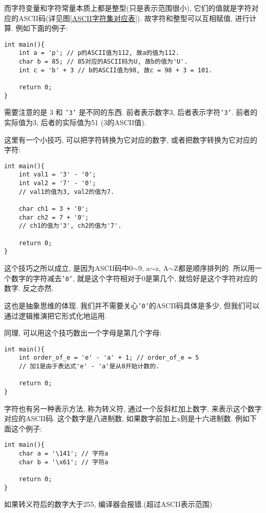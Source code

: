         而字符变量和字符常量本质上都是整型(只是表示范围很小), 它们的值就是字符对应的ASCII码(详见图\ref{ASCII字符集对应表}). 故字符和整型可以互相赋值, 进行计算. 例如下面的例子:
\begin{lstlisting}
int main(){
    int a = 'p'; // p的ASCII值为112, 故a的值为112.
    char b = 85; // 85对应的ASCII码为U, 故b的值为'U'.
    int c = 'b' + 3 // b的ASCII值为98, 故c = 98 + 3 = 101.

    return 0;
}
\end{lstlisting}

        需要注意的是 3 和 \texttt{'3'} 是不同的东西. 前者表示数字3, 后者表示字符\texttt{'3'}. 前者的实际值为3, 后者的实际值为51 (3的ASCII值).

        这里有一个小技巧, 可以把字符转换为它对应的数字, 或者把数字转换为它对应的字符:
\begin{lstlisting}
int main(){
    int val1 = '3' - '0'; 
    int val2 = '7' - '0';
    // val1的值为3, val2的值为7.

    char ch1 = 3 + '0';
    char ch2 = 7 + '0';
    // ch1的值为'3', ch2的值为'7'.

    return 0;
}
\end{lstlisting}
        
        这个技巧之所以成立, 是因为ASCII码中0$\sim$9, a$\sim$z, A$\sim$Z都是顺序排列的. 所以用一个数字的字符减去\texttt{'0'}, 就是这个字符相对于0是第几个, 就恰好是这个字符对应的数字. 反之亦然.

        这也是抽象思维的体现. 我们并不需要关心\texttt{'0'}的ASCII码具体是多少, 但我们可以通过逻辑推演把它形式化地运用.

        同理, 可以用这个技巧数出一个字母是第几个字母:
\begin{lstlisting}
int main(){
    int order_of_e = 'e' - 'a' + 1; // order_of_e = 5
    // 加1是由于表达式'e' - 'a'是从0开始计数的.

    return 0;
}
\end{lstlisting}

        字符也有另一种表示方法, 称为转义符, 通过一个反斜杠加上数字, 来表示这个数字对应的ASCII码. 这个数字是八进制数, 如果数字前加上x则是十六进制数. 例如下面这个例子:
\begin{lstlisting}
int main(){
    char a = '\141'; // 字符a
    char b = '\x61'; // 字符a

    return 0;
}
\end{lstlisting}

        如果转义符后的数字大于255, 编译器会报错.(超过ASCII表示范围)

